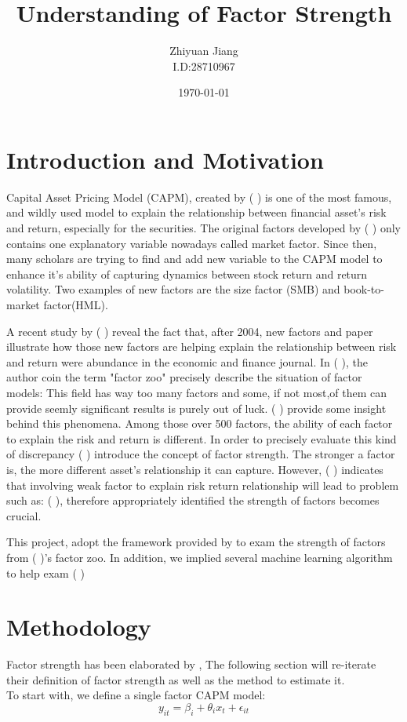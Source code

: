 \documentclass[12pt]{article}
\title{Understanding of Factor Strength}
\author{Zhiyuan Jiang\\I.D:28710967}
\date{\today}
\begin{document}
	\maketitle	
	\newpage
	\tableofcontents
	\newpage
	\section{Introduction and Motivation}
Capital Asset Pricing Model (CAPM), created by (      )    is one of the most famous, and wildly used model to explain the relationship between financial asset's risk and return, especially for the securities.  
The original factors developed by ( ) only contains one explanatory variable nowadays called market factor. 
Since then, many scholars are trying to find and add new variable to the CAPM model to enhance it's ability of capturing dynamics between stock  return and return volatility. 
Two examples of new factors are the size factor (SMB) and book-to-market factor(HML). 

A recent study by (   ) reveal the fact that, after 2004, new factors and paper illustrate how those new factors are helping explain the relationship between risk and return were abundance in the economic and finance journal. 
In (   ),  the author coin the term "factor zoo" precisely describe the situation of factor models: This field has way too many factors and some, if not most,of them can provide seemly significant results is purely out of luck. 
(  ) provide some insight behind this phenomena. 
Among those over 500 factors, the ability of each factor to explain the risk and return is different. 
In order to precisely evaluate this kind of  discrepancy ( )  introduce the concept of factor strength. 
The stronger a factor is, the more different asset's relationship it can capture. 
However, (  ) indicates that involving weak factor to explain risk return relationship will lead to problem such as: (      ), therefore appropriately identified the  strength of factors becomes crucial.

This project, adopt the framework provided by  to exam the strength of factors from (   )'s factor zoo. 
In addition, we implied several machine learning algorithm to help exam (                   )



	\section{Methodology}
Factor strength has been elaborated by , The following section will re-iterate their definition of factor strength as well as the method to estimate it.\\
To start with, we define a single factor CAPM model:
\[  y_{it} = \beta_i + \theta_{i}x_t + \epsilon_{it}  \tag{1}\label{simpleCAPM} \]
\end{document}
